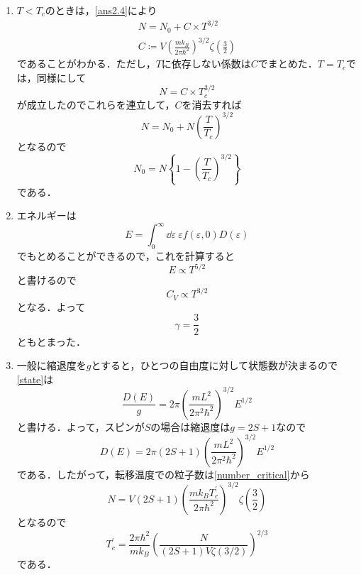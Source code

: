 \documentclass[a4paper,pdflatex,ja=standard]{bxjsarticle}
\begin{document}
\begin{enumerate}
  \item 
  $T<T_{c}$のときは，\eqref{ans2.4}により
  \begin{gather}
    N
    =
    N_{0}
    +
    C\times T^{3/2}
    \\
    C\coloneqq
    V
    \left(  
      \frac{mk_B}{2\pi\hbar^2}
    \right)^{3/2}
    \zeta\left( \frac{3}{2} \right)
  \end{gather}
  であることがわかる．ただし，$T$に依存しない係数は$C$でまとめた．$T=T_{c}$では，同様にして
  \begin{equation}
    N=C\times T_{c}^{3/2}
  \end{equation}
  が成立したのでこれらを連立して，$C$を消去すれば
  \begin{equation}
    N=N_{0}+N\left( \frac{T}{T_{c}} \right)^{3/2}
  \end{equation}
  となるので
  \begin{equation}
    N_{0}
    =
    N\left\{ 1-\left( \frac{T}{T_{c}} \right)^{3/2} \right\}
  \end{equation}
  である．

  \item 
  エネルギーは
  \begin{equation}
    E
    =
    \int_{0}^{\infty}\dd \varepsilon\ \varepsilon f(\varepsilon,0)D(\varepsilon)
  \end{equation}
  でもとめることができるので，これを計算すると
  \begin{equation}
    E
    \propto
    T^{5/2}
  \end{equation}
  と書けるので
  \begin{equation}
    C_{V}\propto T^{3/2}
  \end{equation}
  となる．よって
  \begin{equation}
    \gamma=\frac{3}{2}
  \end{equation}
  ともとまった．

  \item 
  一般に縮退度を$g$とすると，ひとつの自由度に対して状態数が決まるので\eqref{state}は
  \begin{equation}
    \frac{D(E)}{g}
    =
    2\pi
    \left(  
      \frac{mL^2}{2\pi^2\hbar^2}
    \right)^{3/2}
    E^{1/2}
  \end{equation}
  と書ける．よって，スピンが$S$の場合は縮退度は$g=2S+1$なので
  \begin{equation}
    D(E)
    =
    2\pi(2S+1)
    \left(  
      \frac{mL^2}{2\pi^2\hbar^2}
    \right)^{3/2}
    E^{1/2}
  \end{equation}
  である．したがって，転移温度での粒子数は\eqref{number_critical}から
  \begin{equation}
    N
    =
    V(2S+1)
    \left(  
      \frac{mk_BT_c^{\prime}}{2\pi\hbar^2}
    \right)^{3/2}
    \zeta\left( \frac{3}{2} \right)
  \end{equation}
  となるので
  \begin{equation}
    T_{c}^{\prime}
    =
    \frac{2\pi\hbar^2}{mk_B}
    \left(  
      \frac{N}{(2S+1)V\zeta(3/2)}
    \right)^{2/3}
  \end{equation}
  である．


\end{enumerate}
\end{document}
